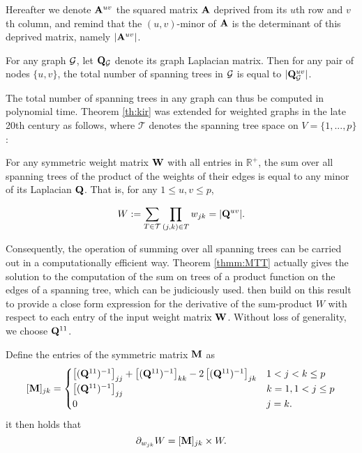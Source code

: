  Hereafter we denote ${\bf A}^{uv}$ the squared matrix ${\bf A}$ deprived from its $u$th row and $v$th column, and remind that the $(u, v)$-minor of ${\bf A}$ is the determinant of this deprived matrix, namely $|{\bf A}^{uv}|$.
 
 \begin{theorem}\label{th:kir}
 For any graph $\mathcal{G}$, let  ${\bf Q}_{\mathcal{G}}$ denote its graph Laplacian matrix. Then for any  pair of nodes $\{u,v\}$, the total number of spanning trees in $\mathcal{G}$ is equal to  $|{\bf Q}_{\mathcal{G}}^{uv}|$.
\end{theorem}  

 
The total number of spanning trees in any graph can thus be computed in polynomial time. Theorem \ref{th:kir} was extended for weighted graphs in the late 20th century as follows, where $\mathcal{T}$ denotes the spanning tree space on $V=\{1,...,p\}$:

\begin{theorem} \label{thmm:MTT}
    For any symmetric weight matrix ${\bf W}$ with all entries in $\mathds{R}^+$, the sum over all spanning trees of the product of the weights of their edges is equal to any minor of its Laplacian ${\bf Q}$. That is, for any $1 \leq u, v \leq p$,
 
   \[
    W := \sum_{T\in\mathcal{T}} \prod_{(j, k)\in T} w_{jk} = |{\bf Q}^{uv}|.
    \]
   
\end{theorem}    

Consequently, the operation of summing over all spanning trees can be carried out in a computationally efficient way.  Theorem \ref{thmm:MTT} actually gives the solution to the computation of the sum on trees of a product function on the edges of a spanning tree, which can be judiciously used. \cite{MeilaJaak} then build on this result to provide a close form expression for the derivative of the sum-product $W$ with respect to each entry of the input weight matrix ${\bf W}$.   Without loss of generality, we choose ${\bf Q}^{11}$.

\begin{lemma}  \label{lemm:Meila}
    Define the entries of the symmetric matrix ${\bf M}$ as
\[    
 [{\bf M}]_{jk} =\begin{cases}
    \left[({\bf Q}^{11})^{-1}\right]_{jj} + \left[({\bf Q}^{11})^{-1}\right]_{kk} -2\left[({\bf Q}^{11})^{-1}\right]_{jk} & 1< j<k \leq p\\
    \left[({\bf Q}^{11})^{-1}\right]_{jj} & k=1, 1< j \leq p  \\
    0 &  j=k .
    \end{cases}
\] 
it then holds that
$$\partial_{w_{jk}} W = [{\bf M}]_{jk}  \times W.$$
\end{lemma}

